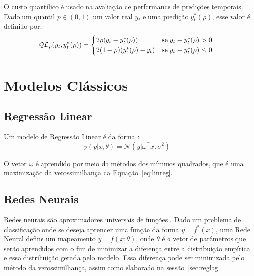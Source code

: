 O custo quantílico é usado na avaliação de performance de predições temporais. \\
Dado um quantil $p \in (0,1)$ um valor real $y_{t}$ e uma predição $y^{*}_{t}(\rho)$, esse valor é definido por: \\

\begin{equation}
  \mathcal{QL}_{\rho}(y_{t},y^{*}_{t}(\rho)) =
\begin{cases*}
  2 \rho(y_{t} - y^{*}_{t}(\rho)) & se $ y_{t} - y^{*}_{t}(\rho) > 0$ \\
  2 (1 - \rho)(y^{*}_{t}(\rho) - y_{t}) & se $y_{t} - y^{*}_{t}(\rho) \leq 0$
\end{cases*}
\end{equation}




\section{Modelos Clássicos} 



\subsection{Regressão Linear}

Um modelo de Regressão Linear é da forma \citep{bayesml}:
\begin{equation}
 \label{eq:linreg}
  p(y| x, \theta) = \mathcal{N}(y | \omega^\intercal x, \sigma^2)
\end{equation}

O vetor $\omega$ é aprendido por meio do métodos dos mínimos quadrados, que é
uma maximização da verossimilhança da Equação~\ref{eq:linreg}.


\subsection{Redes Neurais}

\label{sec:nn}
Redes neurais são aproximadores universais de funções \citep{nnuni}. Dado um problema
de classificação onde se deseja aprender uma função da forma $y = f^*(x)$, uma
Rede Neural define um mapeamento $y = f(x ; \theta)$, onde $\theta$ é o vetor de
parâmetros que serão aprendidos com o fim de minimizar a diferença entre a
distribuição empírica e essa distribuição gerada pelo modelo. Essa diferença pode
ser minimizada pelo método da verossimilhança, assim como elaborado na sessão~\ref{sec:reglog}.\\

